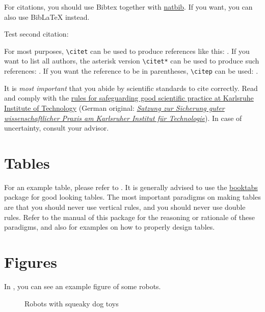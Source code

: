 For citations, you should use Bibtex together with
\href{https://www.ctan.org/pkg/natbib}{natbib}.
If you want, you can also use BibLaTeX instead.

Test second citation: \citet{kober2013reinforcement}

For most purposes, \texttt{\textbackslash{}citet} can be used to produce references like this: \citet{deisenroth2013survey}.
If you want to list all authors, the asterisk version \texttt{\textbackslash{}citet*} can be used to produce such references: \citet*{deisenroth2013survey}.
If you want the reference to be in parentheses, \texttt{\textbackslash{}citep} can be used: \citep{deisenroth2013survey}.

It is \emph{most important} that you abide by scientific standards to cite correctly.
Read and comply with the \href{https://www.kit.edu/downloads/gute_wiss_praxis_en.pdf}{rules for safeguarding good scientific practice at Karlsruhe Institute of Technology} (German original:  \href{https://www.sle.kit.edu/downloads/AmtlicheBekanntmachungen/2018_AB_032.pdf}{\textit{Satzung zur Sicherung guter wissenschaftlicher Praxis am Karlsruher Institut für Technologie}}).
In case of uncertainty, consult your advisor.


\section{Tables}

For an example table, please refer to .
It is generally advised to use the \href{https://ctan.org/pkg/booktabs?lang=en}{booktabs} package for good looking tables.
The most important paradigms on making tables are that you should never use vertical rules, and you should never use double rules.
Refer to the manual of this package for the reasoning or rationale of these paradigms, and also for examples on how to properly design tables.


\section{Figures}

In , you can see an example figure of some robots.

\begin{figure}[ht!]
    \centering
    \hspace{1cm}                       
    \caption{Robots with squeaky dog toys}
    \label{fig:example}
\end{figure}

